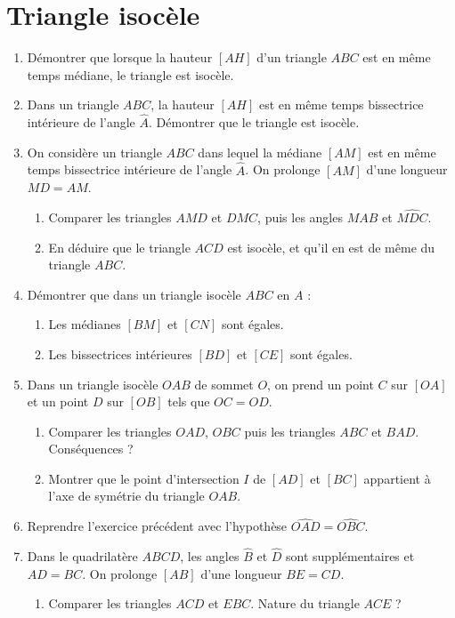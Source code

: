 \documentclass[12 pt]{report}
\theoremstyle{plain}
\newcounter{n}
\begin{document}
\chapter{Triangle isocèle}
\begin{enumerate}
\item Démontrer que lorsque la hauteur $[AH]$ d'un triangle $ABC$ est en même temps médiane, le triangle est isocèle.
\item Dans un triangle $ABC$, la hauteur $[AH]$ est en même temps bissectrice intérieure de l'angle $\widehat{A}$. Démontrer que le triangle est isocèle.
\item On considère un triangle $ABC$ dans lequel la médiane $[AM]$ est 
en même temps bissectrice intérieure de l'angle $\widehat{A}$. On prolonge $[AM]$ 
d'une longueur $MD=AM$. \begin{enumerate}
\item Comparer les triangles $AMD$ et $DMC$, puis les angles $\widehat{MAB}$ et 
$\widehat{MDC}$. 
\item En déduire que le triangle $ACD$ est isocèle, et qu'il en est de même du triangle $ABC$.
\end{enumerate}
\item Démontrer que dans un triangle isocèle $ABC$ en $A$ : \begin{enumerate}
\item Les médianes $[BM]$ et $[CN]$ sont égales. 
\item Les bissectrices intérieures $[BD]$ et $[CE]$ sont égales.
\end{enumerate}
\item Dans un triangle isocèle $OAB$ de sommet $O$, on prend un point $C$ sur $[OA]$
et un point $D$ sur $[OB]$ tels que $OC=OD$.\begin{enumerate}
\item Comparer les triangles $OAD$, $OBC$ puis les triangles $ABC$ et $BAD$. Conséquences ? 
\item Montrer que le point d'intersection $I$ de $[AD]$ et $[BC]$ appartient à l'axe
de symétrie du triangle $OAB$.
\end{enumerate}
\item Reprendre l'exercice précédent avec l'hypothèse $\widehat{OAD}=\widehat{OBC}$.
\item Dans le quadrilatère $ABCD$, les angles $\widehat{B}$ et $\widehat{D}$ sont supplémentaires et $AD=BC$. On prolonge $[AB]$ d'une longueur $BE=CD$.
\begin{enumerate}
\item Comparer les triangles $ACD$ et $EBC$. Nature du triangle $ACE$ ?

\end{enumerate}
\end{enumerate}
\end{document}
